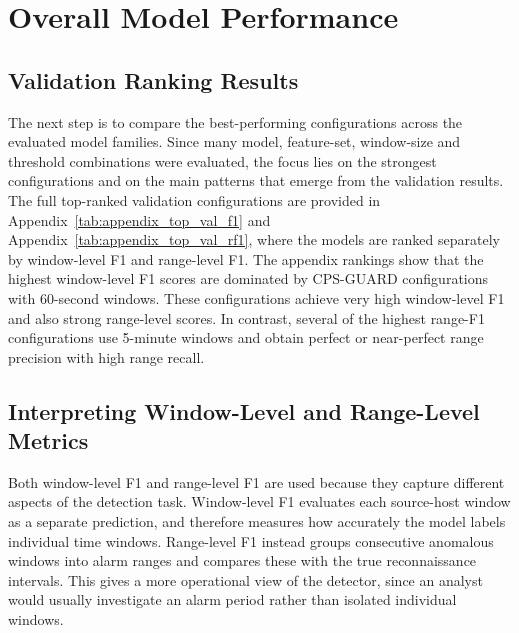 



\section{Overall Model Performance}
\label{sec:overall_model_performance}
\subsection{Validation Ranking Results}
The next step is to compare the best-performing configurations across the evaluated model families. Since many model, feature-set, window-size and threshold combinations were evaluated, the focus lies on the strongest configurations and on the main patterns that emerge from the validation results. The full top-ranked validation configurations are provided in Appendix~\ref{tab:appendix_top_val_f1} and Appendix~\ref{tab:appendix_top_val_rf1}, where the models are ranked separately by window-level F1 and range-level F1. The appendix rankings show that the highest window-level F1 scores are dominated by CPS-GUARD configurations with 60-second windows. These configurations achieve very high window-level F1 and also strong range-level scores. In contrast, several of the highest range-F1 configurations use 5-minute windows and obtain perfect or near-perfect range precision with high range recall.

\subsection{Interpreting Window-Level and Range-Level Metrics}
Both window-level F1 and range-level F1 are used because they capture different aspects of the detection task. Window-level F1 evaluates each source-host window as a separate prediction, and therefore measures how accurately the model labels individual time windows. Range-level F1 instead groups consecutive anomalous windows into alarm ranges and compares these with the true reconnaissance intervals. This gives a more operational view of the detector, since an analyst would usually investigate an alarm period rather than isolated individual windows.

